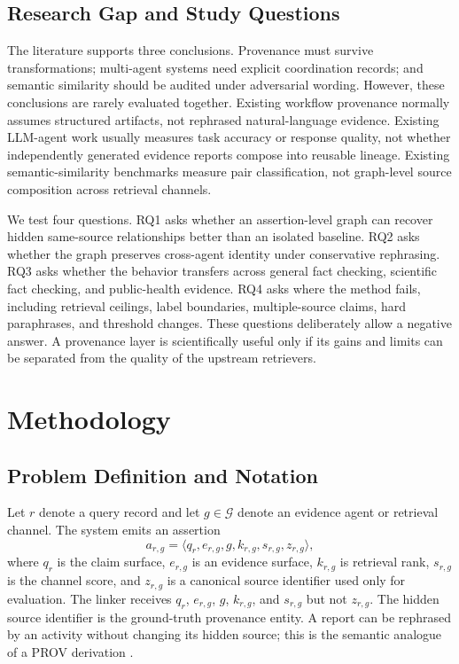 \documentclass{ieeeaccess}
\begin{document}
\subsection{Research Gap and Study Questions}
The literature supports three conclusions. Provenance must survive transformations; multi-agent systems need explicit coordination records; and semantic similarity should be audited under adversarial wording. However, these conclusions are rarely evaluated together. Existing workflow provenance normally assumes structured artifacts, not rephrased natural-language evidence. Existing LLM-agent work usually measures task accuracy or response quality, not whether independently generated evidence reports compose into reusable lineage. Existing semantic-similarity benchmarks measure pair classification, not graph-level source composition across retrieval channels.

We test four questions. RQ1 asks whether an assertion-level graph can recover hidden same-source relationships better than an isolated baseline. RQ2 asks whether the graph preserves cross-agent identity under conservative rephrasing. RQ3 asks whether the behavior transfers across general fact checking, scientific fact checking, and public-health evidence. RQ4 asks where the method fails, including retrieval ceilings, label boundaries, multiple-source claims, hard paraphrases, and threshold changes. These questions deliberately allow a negative answer. A provenance layer is scientifically useful only if its gains and limits can be separated from the quality of the upstream retrievers.

\section{Methodology}
\subsection{Problem Definition and Notation}
Let $r$ denote a query record and let $g\in\mathcal{G}$ denote an evidence agent or retrieval channel. The system emits an assertion
\begin{equation}
 a_{r,g}=\langle q_r,e_{r,g},g,k_{r,g},s_{r,g},z_{r,g}\rangle,
 \label{eq:assertion}
\end{equation}
where $q_r$ is the claim surface, $e_{r,g}$ is an evidence surface, $k_{r,g}$ is retrieval rank, $s_{r,g}$ is the channel score, and $z_{r,g}$ is a canonical source identifier used only for evaluation. The linker receives $q_r$, $e_{r,g}$, $g$, $k_{r,g}$, and $s_{r,g}$ but not $z_{r,g}$. The hidden source identifier is the ground-truth provenance entity. A report can be rephrased by an activity without changing its hidden source; this is the semantic analogue of a PROV derivation \cite{w3c2013prov}.
\end{document}
